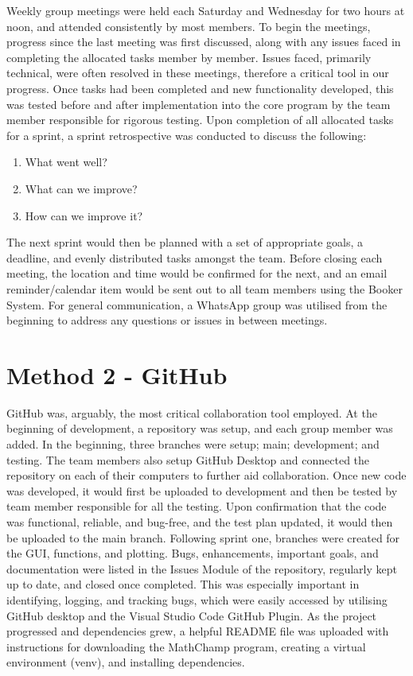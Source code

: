 \documentclass[a4paper, oneside, 11pt]{report}
\begin{document}
Weekly group meetings were held each Saturday and Wednesday for two hours at noon, and attended consistently by most members. To begin the meetings, progress since the last meeting was first discussed, along with any issues faced in completing the allocated tasks member by member. Issues faced, primarily technical, were often resolved in these meetings, therefore a critical tool in our progress. Once tasks had been completed and new functionality developed, this was tested before and after implementation into the core program by the team member responsible for rigorous testing. Upon completion of all allocated tasks for a sprint, a sprint retrospective was conducted to discuss the following: 

\begin{enumerate}
    \item What went well? 
    \item What can we improve? 
    \item How can we improve it?
\end{enumerate}

The next sprint would then be planned with a set of appropriate goals, a deadline, and evenly distributed tasks amongst the team. Before closing each meeting, the location and time would be confirmed for the next, and an email reminder/calendar item would be sent out to all team members using the Booker System. For general communication, a WhatsApp group was utilised from the beginning to address any questions or issues in between meetings.


\section{Method 2 - GitHub}
GitHub was, arguably, the most critical collaboration tool employed. At the beginning of development, a repository was setup, and each group member was added. In the beginning, three branches were setup; main; development; and testing. The team members also setup GitHub Desktop and connected the repository on each of their computers to further aid collaboration. Once new code was developed, it would first be uploaded to development and then be tested by team member responsible for all the testing. Upon confirmation that the code was functional, reliable, and bug-free, and the test plan updated, it would then be uploaded to the main branch. Following sprint one, branches were created for the GUI, functions, and plotting. Bugs, enhancements, important goals, and documentation were listed in the Issues Module of the repository, regularly kept up to date, and closed once completed. This was especially important in identifying, logging, and tracking bugs, which were easily accessed by utilising GitHub desktop and the Visual Studio Code GitHub Plugin. As the project progressed and dependencies grew, a helpful README file was uploaded with instructions for downloading the MathChamp program, creating a virtual environment (venv), and installing dependencies.
\end{document}
